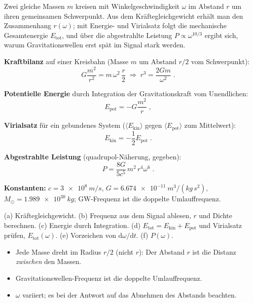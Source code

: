 
Zwei gleiche Massen $m$ kreisen mit Winkelgeschwindigkeit $\omega$ im Abstand
$r$ um ihren gemeinsamen Schwerpunkt. Aus dem Kräftegleichgewicht erhält man
den Zusammenhang $r(\omega)$; mit Energie- und Virialsatz folgt die
mechanische Gesamtenergie $E_\mathrm{tot}$, und über die abgestrahlte
Leistung $P \propto \omega^{10/3}$ ergibt sich, warum Gravitationswellen
erst spät im Signal stark werden.

\begin{werkzeugkasten}[Werkzeuge]
\textbf{Kraftbilanz} auf einer Kreisbahn (Masse $m$ um Abstand $r/2$ vom
Schwerpunkt):
\begin{equation}
  G\frac{m^2}{r^2} = m\,\omega^2\,\frac r2
  \;\Rightarrow\;
  r^3 = \frac{2Gm}{\omega^2}\;.
\end{equation}

\textbf{Potentielle Energie} durch Integration der Gravitationskraft vom
Unendlichen:
\begin{equation}
  E_\mathrm{pot} = -G\frac{m^2}{r}\;,
\end{equation}

\textbf{Virialsatz} für ein gebundenes System ($\langle E_\mathrm{kin}\rangle
$ gegen $\langle E_\mathrm{pot}\rangle$ zum Mittelwert):
\begin{equation}
  E_\mathrm{kin} = -\frac12 E_\mathrm{pot} \;.
\end{equation}

\textbf{Abgestrahlte Leistung} (quadrupol-Näherung, gegeben):
\begin{equation}
  P = \frac{8G}{5c^5}\,m^2\, r^4 \omega^6\;.
\end{equation}

\textbf{Konstanten:} $c=\qty{3e8}{m/s}$, $G=\qty{6.674e-11}{m^3/(kg\,s^2)}$,
$M_\odot=\qty{1.989e30}{kg}$; GW-Frequenz ist die doppelte Umlauffrequenz.
\end{werkzeugkasten}

\begin{werkzeugkasten}
(a) Kräftegleichgewicht. (b) Frequenz aus dem Signal ablesen, $r$ und Dichte
berechnen. (c) Energie durch Integration. (d) $E_\mathrm{tot}=E_\mathrm{kin}+
E_\mathrm{pot}$ und Virialsatz prüfen, $E_\mathrm{tot}(\omega)$. (e)
Vorzeichen von $\mathrm d\omega/\mathrm dt$. (f) $P(\omega)$.
\end{werkzeugkasten}

\begin{achtung}
\begin{itemize}
  \item Jede Masse dreht im Radius $r/2$ (nicht $r$): Der Abstand $r$ ist die
       Distanz \emph{zwischen} den Massen.
  \item Gravitationswellen-Frequenz ist die doppelte Umlauffrequenz.
  \item $\omega$ variiert; es bei der Antwort auf das Abnehmen des Abstands
       beachten.
\end{itemize}
\end{achtung}
